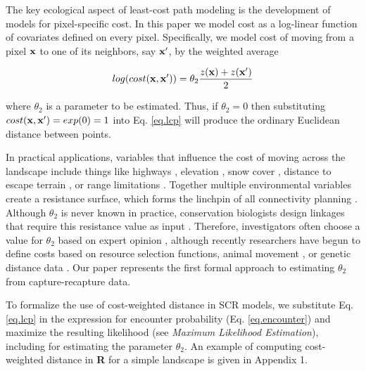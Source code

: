 \documentclass[12pt]{article}
\begin{document}
\begin{spacing}{1.8}
The key ecological aspect of least-cost path modeling is the
development
of models for pixel-specific cost.
In this paper we model cost as a log-linear function of covariates
defined on every pixel.
Specifically, we model cost of
moving from a pixel ${\bf x}$ to one of its neighbors, say ${\bf
  x}'$, by the weighted average 

\begin{equation}
 log(cost({\bf x},{\bf x}'))=  \theta_{2} \frac{z({\bf x})+z({\bf x}')}{2}
\label{eq.cost}
\end{equation}

{\flushleft
where $\theta_{2}$ is a parameter to be estimated.} Thus, if $\theta_{2} = 0$ then substituting $cost({\bf x},{\bf x}')
=exp(0) = 1$ into
Eq. \ref{eq.lcp} will produce the ordinary Euclidean distance
between points.

In practical applications, variables that influence the cost of moving
across the landscape include things like highways
\citep[e.g.,][]{epps_etal:2005}, elevation \citep{cushman_etal:2006},
 snow cover
\citep{schwartz_etal:2009}, distance to escape terrain
\citep{shirk_etal:2010}, or range limitations
\citep{mcrae_beier:2007}.  Together multiple environmental variables
create a resistance surface, which forms the linchpin of all
connectivity planning \citep{spear_etal:2010}.  
 Although $\theta_{2}$ is never known in practice,
conservation biologists design linkages that require this resistance
value as input \citep[see][and articles cited
therein]{beier_etal:2008}. 
Therefore, investigators often choose a value for $\theta_{2}$ 
based on 
expert opinion \citep{beier_etal:2008}, although recently researchers
have begun to define costs based on resource selection functions,
animal movement \citep{tracy:2006, fortin_etal:2005}, or genetic
distance data \citep{gerlach_musolf:2000,
schwartz_etal:2009}. Our paper represents the first formal approach
to estimating $\theta_{2}$ from capture-recapture data. 

To formalize the use of cost-weighted distance in SCR models, we
substitute Eq. \ref{eq.lcp} in the expression for encounter
probability (Eq. \ref{eq.encounter}) and maximize the resulting
likelihood (see {\it Maximum Likelihood Estimation}), including for estimating the
parameter $\theta_{2}$. An example of computing cost-weighted distance
in {\bf R} for a simple landscape is given in Appendix 1. 



\end{spacing}
\end{document}
